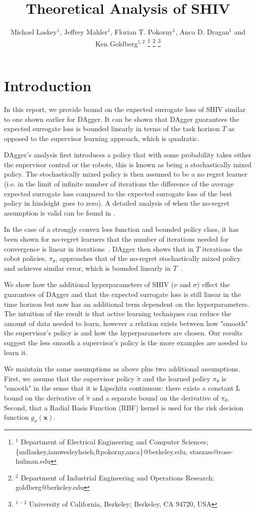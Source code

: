 \documentclass[10pt, conference]{ieeeconf}      %
\title{Theoretical Analysis of SHIV }
\author{Michael Laskey$^1$, Jeffrey Mahler$^1$, Florian T. Pokorny$^1$, Anca D. Dragan$^1$ and Ken Goldberg$^{1,2}$%
\thanks{$^1$ Department of Electrical Engineering and Computer Sciences; {\small \{mdlaskey,iamwesleyhsieh,ftpokorny,anca\}@berkeley.edu, \small staszass@rose-hulman.edu} }%
\thanks{$^2$ Department of Industrial Engineering and Operations Research; {\small goldberg@berkeley.edu}}%
\thanks{$^{1-2}$ University of California, Berkeley;  Berkeley, CA 94720, USA}%
}
\newcommand{\bx}{\mathbf{x}}
\begin{document}
\maketitle
\thispagestyle{empty}
\pagestyle{empty}


\section{Introduction}\label{sec:Intro}
In this report, we provide bound on the expected surrogate loss of SHIV similar to one shown earlier for DAgger. It can be shown that DAgger guarantees the expected surrogate loss is bounded linearly in terms of the task horizon $T$ as opposed to the supervisor learning approach, which is quadratic. 

DAgger's analysis first introduces a policy that with some probability takes either the supervisor control or the robots, this is known as being a stochastically mixed policy. The stochastically mixed policy is then assumed to be a no regret learner (i.e. in the limit of infinite number of iterations the difference of the average expected surrogate loss compared to the expected surrogate loss of the best policy in hindsight goes to zero). A detailed analysis of when the no-regret assumption is valid can be found in \cite{ross2011stability}.

 In the case of a strongly convex loss function and bounded policy class, it has been shown for no-regret learners that the number of iterations needed for convergence is linear in iterations~\cite{shalev2009mind}. DAgger then shows that in $T$ iterations the robot policies, $\pi_\theta$, approaches that of the no-regret stochastically mixed policy and achieves similar error, which is bounded linearly in $T$~\cite{ross2010reduction}. 

We show how the additional hyperparameters of SHIV ($\nu$ and $\sigma$) effect the guarantees of DAgger and that the expected surrogate loss is still linear in the time horizon but now has  an additional term dependent on the hyperparameters. The intuition of the result is that active learning techniques can reduce the amount of data needed to learn, however a relation exists between how "smooth" the supervisor's policy is and how the hyperparameters are chosen. Our results suggest the less smooth a supervisor's policy is the more examples are needed to learn it.


 We maintain the same assumptions as above plus two additional assumptions.  First, we assume that the supervisor policy $\tilde{\pi}$ and the learned policy $\pi_\theta$ is "smooth" in the sense that it is Lipschitz continuous: there exists a constant L bound on the derivative of $\tilde{\pi}$ and a separate bound on the derivative of $\pi_\theta$. Second, that a Radial Basis Function (RBF) kernel is used for the risk decision function $g_{\sigma}(\bx)$.
\end{document}
